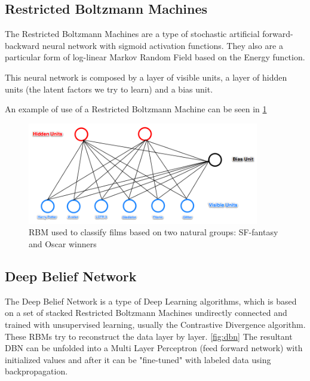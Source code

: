 \documentclass[a4paper,openany,oneside,12pt]{book}
\begin{document}
\subsection{Restricted Boltzmann Machines}
The Restricted Boltzmann Machines are a type of stochastic artificial forward-backward neural network with sigmoid activation functions. They also are a particular form of log-linear Markov Random Field based on the Energy function.

This neural network is composed by a layer of visible units, a layer of hidden units (the latent factors we try to learn) and a bias unit.

An example of use of a Restricted Boltzmann Machine can be seen in \ref{fig:rbm}

\begin{figure}
\centering
\includegraphics[width=0.9\textwidth]{img/rbm.png} 
\caption{RBM used to classify films based on two natural groups: SF-fantasy and Oscar winners\cite{rbmGit}} \label{fig:rbm}
\end{figure}


\subsection{Deep Belief Network}
The Deep Belief Network is a type of Deep Learning algorithms, which is based on a set of stacked Restricted Boltzmann Machines undirectly connected and trained with unsupervised learning, usually the Contrastive Divergence algorithm. These RBMs try to reconstruct the data layer by layer. \ref{fig:dbn} The resultant DBN can be unfolded into a Multi Layer Perceptron (feed forward network) with initialized values and after it can be "fine-tuned" with labeled data using backpropagation.
\end{document}
